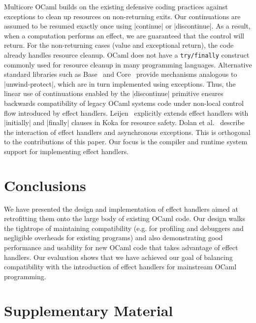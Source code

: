 \documentclass[sigplan,10pt,review,anonymous]{acmart}\settopmatter{printfolios=true,printccs=false,printacmref=false}
\begin{document}
Multicore OCaml builds on the existing defensive coding practices against
exceptions to clean up resources on non-returning exits. Our continuations are
assumed to be resumed exactly once using |continue| or |discontinue|. As a
result, when a computation performs an effect, we are guaranteed that the
control will return. For the non-returning cases (value and exceptional
return), the code already handles resource cleanup. OCaml does not have a
\texttt{\footnotesize try/finally} construct commonly used for resource cleanup
in many programming languages. Alternative standard libraries such as
Base~\cite{BaseProtect} and Core~\cite{CoreProtect} provide mechanisms
analogous to |unwind-protect|, which are in turn implemented using exceptions.
Thus, the linear use of continuations enabled by the |discontinue| primitive
ensures backwards compatibility of legacy OCaml systems code under non-local
control flow introduced by effect handlers. Leijen~\cite{Leijen18} explicitly
extends effect handlers with |initially| and |finally| clauses in Koka for
resource safety. Dolan et al.~\cite{TFP17} describe the interaction
of effect handlers and asynchronous exceptions. This is orthogonal to the
contributions of this paper. Our focus is the compiler and runtime system
support for implementing effect handlers.

\vspace{-3mm}
\section{Conclusions}
\label{sec:conc}

We have presented the design and implementation of effect handlers aimed at
retrofitting them onto the large body of existing OCaml code. Our design walks
the tightrope of maintaining compatibility (e.g. for profiling and debuggers
and negligible overheads for existing programs) and also demonstrating good
performance and usability for new OCaml code that takes advantage of effect
handlers. Our evaluation shows that we have achieved our goal of balancing
compatibility with the introduction of effect handlers for mainstream OCaml
programming.

\clearpage




\clearpage

\section*{Supplementary Material}
\setcounter{figure}{0}
\end{document}
